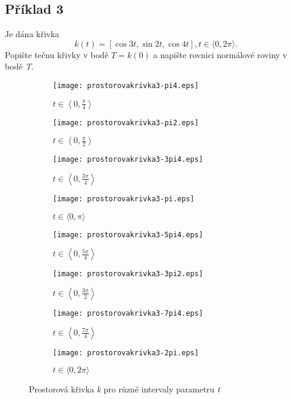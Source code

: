 \subsection*{Příklad 3}
Je dána křivka
$$k(t) = [\cos{3t}, \sin{2t}, \cos{4t}], t \in \langle0, 2\pi\rangle.$$
Popište tečnu křivky v bodě $T=k\left(0\right)$
a napište rovnici normálové roviny v bodě \textit{T}. \\[10pt]
\begin{figure}
	\centering
	\begin{subfigure}[b]{0.3\textwidth}
		\texttt{[image: prostorovakrivka3-pi4.eps]}
		\caption{$t \in \left\langle0, \frac{\pi}{4}\right\rangle$}
	\end{subfigure}%
	\begin{subfigure}[b]{0.3\textwidth}
		\texttt{[image: prostorovakrivka3-pi2.eps]}
		\caption{$t \in \left\langle0, \frac{\pi}{2}\right\rangle$}
	\end{subfigure}
	\begin{subfigure}[b]{0.3\textwidth}
		\texttt{[image: prostorovakrivka3-3pi4.eps]}
		\caption{$t \in \left\langle0, \frac{3\pi}{4}\right\rangle$}
	\end{subfigure}
	\begin{subfigure}[b]{0.3\textwidth}
		\texttt{[image: prostorovakrivka3-pi.eps]}
		\caption{$t \in \langle0, \pi\rangle$}
	\end{subfigure}%
	\begin{subfigure}[b]{0.3\textwidth}
		\texttt{[image: prostorovakrivka3-5pi4.eps]}
		\caption{$t \in \left\langle0, \frac{5\pi}{4}\right\rangle$}
	\end{subfigure}
	\begin{subfigure}[b]{0.3\textwidth}
		\texttt{[image: prostorovakrivka3-3pi2.eps]}
		\caption{$t \in \left\langle0, \frac{3\pi}{2}\right\rangle$}
	\end{subfigure}
	\begin{subfigure}[b]{0.3\textwidth}
		\texttt{[image: prostorovakrivka3-7pi4.eps]}
		\caption{$t \in \left\langle0, \frac{7\pi}{4}\right\rangle$}
	\end{subfigure}
	\begin{subfigure}[b]{0.3\textwidth}
		\texttt{[image: prostorovakrivka3-2pi.eps]}
		\caption{$t \in \langle0, 2\pi\rangle$}
	\end{subfigure}
	\caption{Prostorová křivka \textit{k} pro různé intervaly parametru \textit{t}}
\end{figure}
